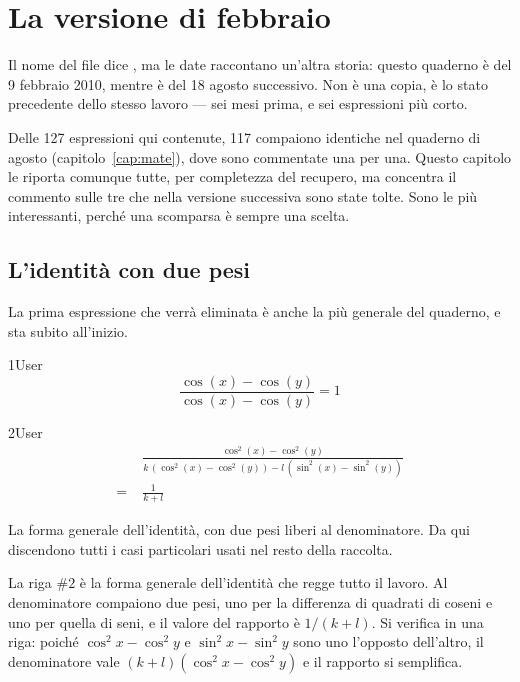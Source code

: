 \chapter{La versione di febbraio}
\label{cap:mate-copia}

Il nome del file dice , ma le date raccontano un'altra storia: questo quaderno è del 9 febbraio 2010, mentre  è del 18 agosto successivo. Non è una copia, è lo stato precedente dello stesso lavoro — sei mesi prima, e sei espressioni più corto.

Delle 127 espressioni qui contenute, 117 compaiono identiche nel quaderno di agosto (capitolo~\ref{cap:mate}), dove sono commentate una per una. Questo capitolo le riporta comunque tutte, per completezza del recupero, ma concentra il commento sulle tre che nella versione successiva sono state tolte. Sono le più interessanti, perché una scomparsa è sempre una scelta.

\section{L'identità con due pesi}

La prima espressione che verrà eliminata è anche la più generale del quaderno, e sta subito all'inizio.

\begin{espr}{1}{User}{\verificata}
\[
\frac{\cos\!\left(x\right) - \cos\!\left(y\right)}{\cos\!\left(x\right) - \cos\!\left(y\right)} = 1
\]
\end{espr}
\begin{espr}{2}{User}{\verificata}
\begin{align*}
& \frac{\cos^{2}\!\left(x\right) - \cos^{2}\!\left(y\right)}{k\, \left(\cos^{2}\!\left(x\right) - \cos^{2}\!\left(y\right)\right) - l\, \left(\sin^{2}\!\left(x\right) - \sin^{2}\!\left(y\right)\right)} \\
=\;& \frac{1}{k + l}
\end{align*}
\end{espr}
La forma generale dell'identità, con due pesi liberi al denominatore. Da qui discendono tutti i casi particolari usati nel resto della raccolta.


La riga $\#2$ è la forma generale dell'identità che regge tutto il lavoro. Al denominatore compaiono due pesi, uno per la differenza di quadrati di coseni e uno per quella di seni, e il valore del rapporto è $1/(k+l)$. Si verifica in una riga: poiché $\cos^2x-\cos^2y$ e $\sin^2x-\sin^2y$ sono uno l'opposto dell'altro, il denominatore vale $(k+l)\left(\cos^2x-\cos^2y\right)$ e il rapporto si semplifica.

